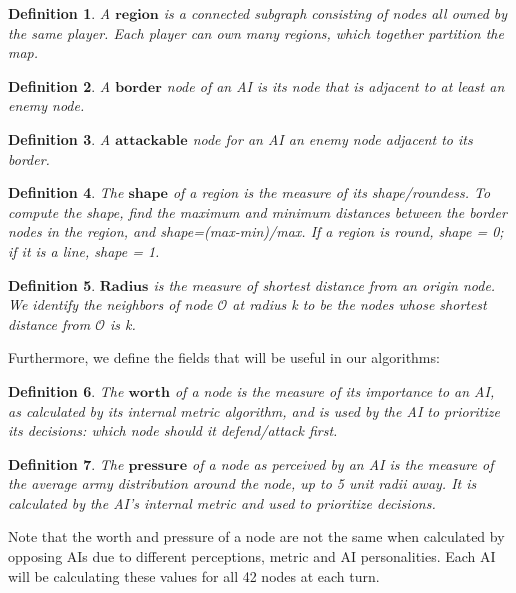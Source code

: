 \documentclass[12pt]{article}  %
\newtheorem{definition}{Definition}
\begin{document}
\begin{definition} \label{region}
A $\textbf{region}$ is a connected subgraph consisting of nodes all owned by the same player. Each player can own many regions, which together partition the map.
\end{definition}

\begin{definition} \label{border}
A $\textbf{border}$ node of an AI is its node that is adjacent to at least an enemy node.
\end{definition}

\begin{definition} \label{attackable}
A $\textbf{attackable}$ node for an AI an enemy node adjacent to its border.
\end{definition}

\begin{definition} \label{shape}
The $\textbf{shape}$ of a region is the measure of its shape/roundess. To compute the shape, find the maximum and minimum distances between the border nodes in the region, and shape=(max-min)/max. If a region is round, shape = 0; if it is a line, shape = 1.
\end{definition}

\begin{definition} \label{radius}
$\textbf{Radius}$ is the measure of shortest distance from an origin node. We identify the neighbors of node $\mathcal{O}$ at radius k to be the nodes whose shortest distance from $\mathcal{O}$ is k.
\end{definition}


Furthermore, we define the fields that will be useful in our algorithms:

\begin{definition} \label{worth}
The $\textbf{worth}$ of a node is the measure of its importance to an AI, as calculated by its internal metric algorithm, and is used by the AI to prioritize its decisions: which node should it defend/attack first.
\end{definition}

\begin{definition} \label{pressure}
The $\textbf{pressure}$ of a node as perceived by an AI is the measure of the average army distribution around the node, up to 5 unit radii away. It is calculated by the AI's internal metric and used to prioritize decisions.
\end{definition}

Note that the worth and pressure of a node are not the same when calculated by opposing AIs due to different perceptions, metric and AI personalities. Each AI will be calculating these values for all 42 nodes at each turn.
\end{document}
